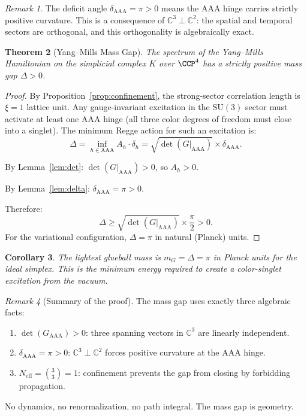 \documentclass[12pt]{article}
\newtheorem{theorem}{Theorem}[section]
\newtheorem{corollary}[theorem]{Corollary}
\theoremstyle{remark}
\newtheorem{remark}[theorem]{Remark}
\theoremstyle{definition}
\newcommand{\CC}{\mathbb{C}}
\begin{document}
\begin{remark}
The deficit angle $\delta_{\mathrm{AAA}} = \pi > 0$ means the AAA
hinge carries strictly positive curvature. This is a consequence of
$\CC^3 \perp \CC^2$: the spatial and temporal sectors
are orthogonal, and this orthogonality is algebraically exact.
\end{remark}

\begin{theorem}[Yang--Mills Mass Gap]
\label{thm:massgap}
The spectrum of the Yang--Mills Hamiltonian on the simplicial complex $K$
over $\CCP^4$ has a strictly positive mass gap $\Delta > 0$.
\end{theorem}

\begin{proof}
By Proposition~\ref{prop:confinement}, the strong-sector correlation
length is $\xi = 1$ lattice unit. Any gauge-invariant excitation in
the $\mathrm{SU}(3)$ sector must activate at least one AAA hinge
(all three color degrees of freedom must close into a singlet).
The minimum Regge action for such an excitation is:
\begin{equation}
\Delta = \inf_{h \in \mathrm{AAA}} A_h \cdot \delta_h
= \sqrt{\det(G|_{\mathrm{AAA}})} \times \delta_{\mathrm{AAA}}.
\end{equation}

By Lemma~\ref{lem:det}: $\det(G|_{\mathrm{AAA}}) > 0$,
so $A_h > 0$.

By Lemma~\ref{lem:delta}: $\delta_{\mathrm{AAA}} = \pi > 0$.

Therefore:
\begin{equation}
\boxed{\Delta \geq \sqrt{\det(G|_{\mathrm{AAA}})} \times
\frac{\pi}{2} > 0.}
\end{equation}
For the variational configuration, $\Delta = \pi$ in natural
(Planck) units.
\end{proof}

\begin{corollary}
The lightest glueball mass is $m_G = \Delta = \pi$ in Planck units
for the ideal simplex. This is the minimum energy required to create
a color-singlet excitation from the vacuum.
\end{corollary}

\begin{remark}[Summary of the proof]
The mass gap uses exactly three algebraic facts:
\begin{enumerate}
\item[(i)] $\det(G_{\mathrm{AAA}}) > 0$: three spanning vectors in
  $\CC^3$ are linearly independent.
\item[(ii)] $\delta_{\mathrm{AAA}} = \pi > 0$:
  $\CC^3 \perp \CC^2$ forces positive curvature at the
  AAA hinge.
\item[(iii)] $N_{\mathrm{eff}} = \binom{3}{3} = 1$: confinement
  prevents the gap from closing by forbidding propagation.
\end{enumerate}
No dynamics, no renormalization, no path integral. The mass gap is
geometry.
\end{remark}
\end{document}
